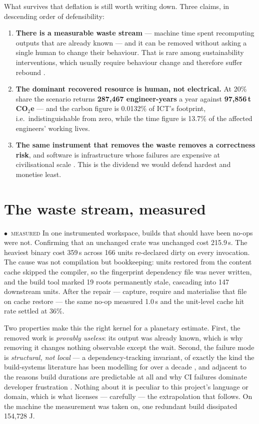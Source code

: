 \documentclass[11pt,a4paper]{article}
\providecommand{\textcite}[1]{\cite{#1}}
\newcommand{\scen}[1]{\textcolor{sigilamber}{\textbf{#1}}}
\newcommand{\stM}{\textcolor{sigilcyan}{$\bullet$}~{\scriptsize\textsc{measured}}}
\begin{document}
What survives that deflation is still worth writing down. Three claims, in descending order of defensibility:


\begin{enumerate}[leftmargin=1.5em,itemsep=3pt]
\item \textbf{There is a measurable waste stream} --- machine time spent recomputing outputs that are already known --- and it can be removed without asking a single human to change their behaviour. That is rare among sustainability interventions, which usually require behaviour change and therefore suffer rebound \textcite{arxiv2506_14653}.
\item \textbf{The dominant recovered resource is human, not electrical.} At 20\% share the scenario returns \scen{287{,}467 engineer-years} a year against \scen{97{,}856\,t\,CO$_2$e} --- and the carbon figure is 0.0132\% of ICT's footprint, i.e.\ indistinguishable from zero, while the time figure is 13.7\% of the affected engineers' working lives.
\item \textbf{The same instrument that removes the waste removes a correctness risk}, and software is infrastructure whose failures are expensive at civilisational scale \textcite{arxiv2506_13821}. This is the dividend we would defend hardest and monetise least.
\end{enumerate}


\section{The waste stream, measured}\label{sec:kernel}


\stM{} In one instrumented workspace, builds that should have been no-ops were not. Confirming that an unchanged crate was unchanged cost 215.9\,s. The heaviest binary cost 359\,s across 166 units re-declared dirty on every invocation. The cause was not compilation but bookkeeping: units restored from the content cache skipped the compiler, so the fingerprint dependency file was never written, and the build tool marked 19 roots permanently stale, cascading into 147 downstream units. After the repair --- capture, require and materialise that file on cache restore --- the same no-op measured 1.0\,s and the unit-level cache hit rate settled at 36\%.


Two properties make this the right kernel for a planetary estimate. First, the removed work is \emph{provably useless}: its output was already known, which is why removing it changes nothing observable except the wait. Second, the failure mode is \emph{structural, not local} --- a dependency-tracking invariant, of exactly the kind the build-systems literature has been modelling for over a decade \textcite{arxiv1203_2704}, and adjacent to the reasons build durations are predictable at all \textcite{arxiv1712_06796} and why CI failures dominate developer frustration \textcite{arxiv2402_09651}. Nothing about it is peculiar to this project's language or domain, which is what licenses --- carefully --- the extrapolation that follows. On the machine the measurement was taken on, one redundant build dissipated 154{,}728 J.
\end{document}
